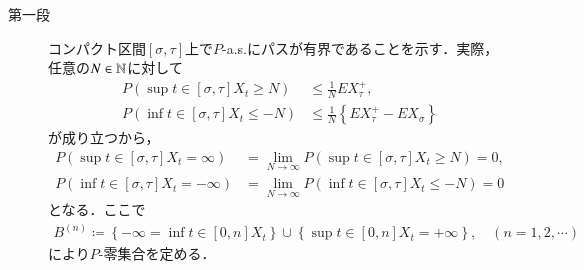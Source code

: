 	\begin{prf}\mbox{}
		\begin{description}
			\item[第一段]
				コンパクト区間$[\sigma,\tau]$上で$P$-a.s.にパスが有界であることを示す．実際，
				任意の$N \in \mathbb{N}$に対して
				\begin{align}
					P\left( \sup{t \in [\sigma,\tau]}{X_t} \geq N \right)
					&\leq \frac{1}{N} EX_\tau^+, \\
					P\left( \inf{t \in [\sigma,\tau]}{X_t} \leq -N \right)
					&\leq \frac{1}{N} \left\{ EX_\tau^+ - EX_\sigma \right\}
				\end{align}
				が成り立つから，
				\begin{align}
					P\left( \sup{t \in [\sigma,\tau]}{X_t} = \infty \right)
					&= \lim_{N \to \infty} P\left( \sup{t \in [\sigma,\tau]}{X_t} \geq N \right)
					= 0, \\
					P\left( \inf{t \in [\sigma,\tau]}{X_t} = -\infty \right)
					&= \lim_{N \to \infty} P\left( \inf{t \in [\sigma,\tau]}{X_t} \leq -N \right)
					= 0
				\end{align}
				となる．ここで
				\begin{align}
					B^{(n)} \coloneqq \left\{ -\infty = \inf{t \in [0,n]}{X_t} \right\} 
					\cup \left\{ \sup{t \in [0,n]}{X_t} = +\infty \right\},
					\quad (n=1,2,\cdots)
				\end{align}
				により$P$-零集合を定める．
			

\end{description}
\end{prf}
